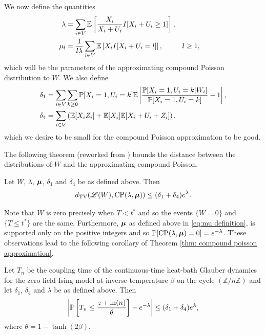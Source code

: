 	We now define the quantities
	\begin{align}
		\lambda &= \sum_{i \in V} \mathbb{E}\left[\frac{X_i}{X_i + U_i} I[ X_i + U_i \geq 1] \right],\\
		\mu_l &= \frac{1}{l \lambda} \sum_{i \in V} \mathbb{E}\left[ X_i I[X_i + U_i = l] \right], && l\geq 1,
		\label{eq:mu definition}
	\end{align}
	which will be the parameters of the approximating compound Poisson distribution to $W$. We also define
	\begin{align}
		\delta_1 &= \sum_{i \in V}  \sum_{k \geq 0} \mathbb{P}[X_i = 1, U_i = k] \mathbb{E} \left|\frac{\mathbb{P}[X_i = 1, U_i = k|W_i]}{\mathbb{P}[X_i = 1, U_i = k]} - 1 \right|, \label{eq:1D delta_1 definition}\\ 
		\delta_4 &= \sum_{i \in V} \left( \mathbb{E}[X_i Z_i] + \mathbb{E}[X_i] \mathbb{E}[X_i + U_i + Z_i] \right), \label{eq:1D delta_4 definition}
	\end{align}
	which we desire to be small for the compound Poisson approximation to be good.

	The following theorem (reworked from \cite{Barbour2001-nh}) bounds the distance between the distributions of $W$ and the approximating compound Poisson.

	\begin{theorem}
	\label{thm: compound poisson approximation}
		Let $W$, $\lambda$, ${\bm{{\mu}}}$, $\delta_1$ and $\delta_4$ be as defined above. Then
		\begin{equation}
			d_{\mathrm{TV}}(\mathscr{L}(W), \mathrm{CP}(\lambda, {\bm{{\mu}}})) \leq (\delta_1 + \delta_4)e^\lambda.
		\end{equation}
	\end{theorem}
	Note that $W$ is zero precisely when $T < t^*$ and so the events $\{W = 0\}$ and $\{T \leq t^*\}$ are the same. Furthermore, ${\bm{{\mu}}}$ as defined above in \eqref{eq:mu definition}, is supported only on the positive integers and so $\mathbb{P}[\mathrm{CP}(\lambda, {\bm{{\mu}}}) = 0] = e^{-\lambda}$. These observations lead to the following corollary of Theorem \ref{thm: compound poisson approximation}.
	\begin{corollary}
	\label{cor:bound distance prob[w=0] and e^-lambda}
	Let $T_n$ be the coupling time of the continuous-time heat-bath Glauber dynamics for the zero-field Ising model at inverse-temperature $\beta$ on the cycle $(\mathbb{Z}/n\mathbb{Z})$ and let $\delta_1$, $\delta_4$ and $\lambda$ be as defined above. Then
		\begin{equation}
			\left|\mathbb{P}\left[T_n \leq \frac{z+\ln(n)}{\theta}\right] - e^{-\lambda}\right| \leq (\delta_1 + \delta_4)e^\lambda,
			\label{eq:bound distance prob[w=0] and e^-lambda}
		\end{equation}
		where $\theta = 1 - \tanh(2\beta)$.
	\end{corollary}	

